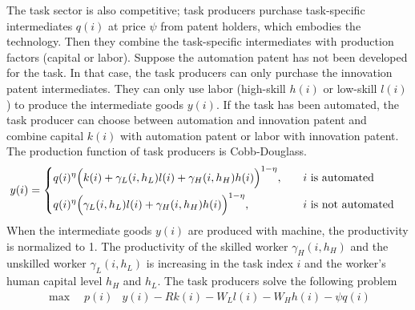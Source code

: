 \documentclass[12pt]{article}
\begin{document}
The task sector is also competitive; task producers purchase task-specific intermediates $q(i)$ at price $\psi$ from patent holders, which embodies the technology. Then they combine the task-specific intermediates with production factors (capital or labor). Suppose the automation patent has not been developed for the task. In that case, the task producers can only purchase the innovation patent intermediates. They can only use labor (high-skill $h(i)$ or low-skill $l(i)$) to produce the intermediate goods $y(i)$. If the task has been automated, the task producer can choose between automation and innovation patent and combine capital $k(i)$ with automation patent or labor with innovation patent. The production function of task producers is Cobb-Douglass. 
\begin{align*}
y(i) &= 
\begin{dcases}
q(i)^{\eta}\Big(k(i) + \gamma_L(i,h_L)l(i)+\gamma_H(i,h_H)h(i)\Big)^{1-\eta} , &\quad \text{$i$ is automated}  \\
q(i)^{\eta}\Big(\gamma_L(i,h_L)l(i)+\gamma_H(i,h_H)h(i)\Big)^{1-\eta} ,&\quad \text{$i$ is not automated}
\end{dcases} 
\end{align*}
When the intermediate goods $y(i)$ are produced with machine, the productivity is normalized to 1. The productivity of the skilled worker $\gamma_H(i,h_H)$ and the unskilled worker $\gamma_L(i,h_L)$ is increasing in the task index $i$ and the worker's human capital level $h_H$ and $h_L$. 
The task producers solve the following problem 
\begin{align*}
\max \quad  p(i)&y(i)-Rk(i)-W_Ll(i)-W_Hh(i)-\psi q(i) 
\end{align*}
\end{document}
